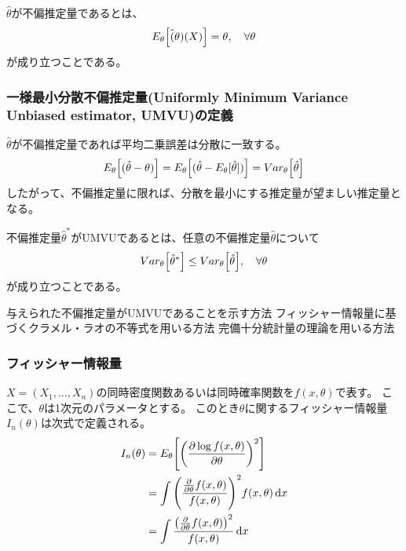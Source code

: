 \(\hat{\theta}\)が不偏推定量であるとは、
\begin{equation}
  E_{\theta} \qty [\hat(\theta)(X)] = \theta, \quad \forall \theta
\end{equation}
が成り立つことである。

\subsubsection{一様最小分散不偏推定量(Uniformly Minimum Variance Unbiased estimator, UMVU)の定義}
\(\hat{\theta}\)が不偏推定量であれば平均二乗誤差は分散に一致する。
\begin{equation}
  E_{\theta} \qty [( \hat{\theta} - \theta )] = E_{\theta} \qty [( \hat{\theta} - E_{\theta}[\hat{\theta}] )] = Var_{\theta} \qty [\hat{\theta}]
\end{equation}
したがって、不偏推定量に限れば、分散を最小にする推定量が望ましい推定量となる。

不偏推定量\(\hat{\theta}^{*}\)がUMVUであるとは、任意の不偏推定量\(\hat{\theta}\)について
\begin{equation}
  Var_{\theta} \qty [\hat{\theta}^{*}] \leq Var_{\theta} \qty [\hat{\theta}], \quad \forall \theta
\end{equation}
が成り立つことである。

\begin{outline}
  \1 与えられた不偏推定量がUMVUであることを示す方法
  \2 フィッシャー情報量に基づくクラメル・ラオの不等式を用いる方法
  \2 完備十分統計量の理論を用いる方法
\end{outline}

\subsubsection{フィッシャー情報量}

\(X = (X_1, \dots, X_n)\)の同時密度関数あるいは同時確率関数を\(f(x, \theta)\)で表す。
ここで、\(\theta\)は1次元のパラメータとする。
このとき\(\theta\)に関するフィッシャー情報量\(I_n(\theta)\)は次式で定義される。
\begin{equation}
  \begin{aligned}
    I_n(\theta) & = E_{\theta} \qty [\qty (\pdv{\log f(x, \theta)}{\theta})^2]                        \\
                & = \int \qty (\frac{\pdv{\theta} f(x, \theta)}{f(x, \theta)}) ^2 f(x, \theta) \dd{x} \\
                & = \int \frac{\qty (\pdv{\theta} f(x, \theta))^2}{f(x, \theta)} \dd{x}
  \end{aligned}
\end{equation}

